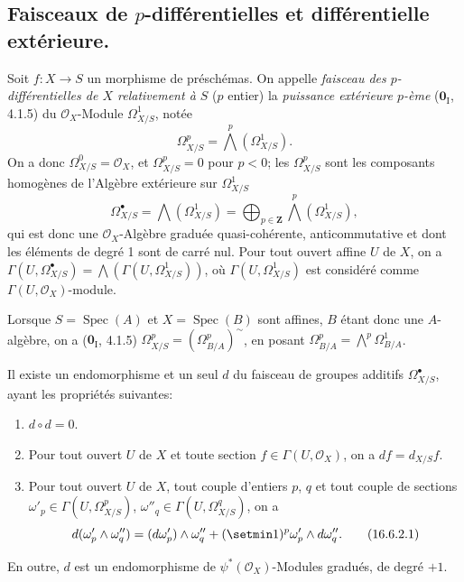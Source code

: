 \subsection{\texorpdfstring{Faisceaux de $p$-différentielles et différentielle extérieure.}{Faisceaux de p-différentielles et différentielle extérieure.}}

\begin{env}[16.6.1]
Soit $f:X\to S$ un morphisme de préschémas. On appelle \emph{faisceau des
$p$-différentielles de $X$ relativement à $S$} ($p$ entier) la
\emph{puissance extérieure $p$-ème} ($\mathbf{0}_{\mathrm I}$, 4.1.5) du $\mathcal{O}_X$-Module
$\varOmega_{X/S}^1$, notée
\[
  \varOmega_{X/S}^p=\bigwedge^p(\varOmega_{X/S}^1).
  \tag{16.6.1.1}
  \label{IV.16.6.1.1}
\]
On a donc $\varOmega_{X/S}^0=\mathcal{O}_X$, et $\varOmega_{X/S}^p=0$ pour $p<0$;
les $\varOmega_{X/S}^p$ sont les composants homogènes de l'Algèbre extérieure
sur $\varOmega_{X/S}^1$
\[
  \varOmega_{X/S}^{\bullet}=\bigwedge(\varOmega_{X/S}^1)
  =\bigoplus_{p\in\mathbf{Z}}\bigwedge^p(\varOmega_{X/S}^1),
  \tag{16.6.1.2}
  \label{IV.16.6.1.2}
\]
qui est donc une $\mathcal{O}_X$-Algèbre graduée quasi-cohérente,
anticommutative et dont les éléments de degré 1 sont de carré nul. Pour tout
ouvert affine $U$ de $X$, on a
$\Gamma(U,\varOmega_{X/S}^{\bullet})=\bigwedge(\Gamma(U,\varOmega_{X/S}^1))$,
où $\Gamma(U,\varOmega_{X/S}^1)$ est considéré comme
$\Gamma(U,\mathcal{O}_X)$-module.

Lorsque $S=\operatorname{Spec}(A)$ et $X=\operatorname{Spec}(B)$ sont
affines, $B$ étant donc une $A$-algèbre, on a ($\mathbf{0}_{\mathrm I}$, 4.1.5)
$\varOmega_{X/S}^p=(\Omega_{B/A}^p)^{\sim}$, en posant
$\Omega_{B/A}^p=\bigwedge^p\Omega_{B/A}^1$.
\end{env}

\begin{theorem}[16.6.2]
\label{IV.16.6.2}
Il existe un endomorphisme et un seul $d$ du faisceau de groupes additifs
$\varOmega_{X/S}^{\bullet}$, ayant les propriétés suivantes:
\begin{enumerate}
\item[\textup{(i)}] $d\circ d=0$.
\item[\textup{(ii)}] Pour tout ouvert $U$ de $X$ et toute section
$f\in\Gamma(U,\mathcal{O}_X)$, on a $df=d_{X/S}f$.
\item[\textup{(iii)}] Pour tout ouvert $U$ de $X$, tout couple d'entiers $p$, $q$ et
tout couple de sections
$\omega'_p\in\Gamma(U,\varOmega_{X/S}^p)$,
$\omega''_q\in\Gamma(U,\varOmega_{X/S}^q)$, on a
\[
  d(\omega'_p\wedge\omega''_q)
  =(d\omega'_p)\wedge\omega''_q
  +(\setmin 1)^p\omega'_p\wedge d\omega''_q.
  \tag{16.6.2.1}
  \label{IV.16.6.2.1}
\]
\end{enumerate}
En outre, $d$ est un endomorphisme de $\psi^*(\mathcal{O}_X)$-Modules
gradués, de degré $+1$.
\end{theorem}

